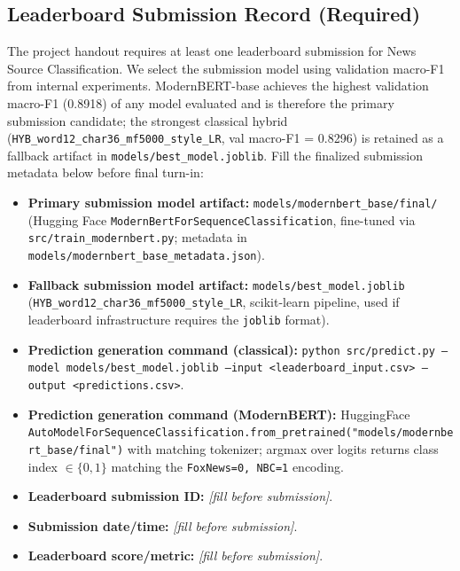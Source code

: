 \documentclass[10pt]{article}
\begin{document}
\subsection{Leaderboard Submission Record (Required)}
The project handout requires at least one leaderboard submission for News Source Classification. We select the submission model using validation macro-F1 from internal experiments. ModernBERT-base achieves the highest validation macro-F1 (0.8918) of any model evaluated and is therefore the primary submission candidate; the strongest classical hybrid (\texttt{HYB\_word12\_char36\_mf5000\_style\_LR}, val macro-F1 = 0.8296) is retained as a fallback artifact in \texttt{models/best\_model.joblib}. Fill the finalized submission metadata below before final turn-in:
\begin{itemize}
    \item \textbf{Primary submission model artifact:} \texttt{models/modernbert\_base/final/} (Hugging Face \texttt{ModernBertForSequenceClassification}, fine-tuned via \texttt{src/train\_modernbert.py}; metadata in \texttt{models/modernbert\_base\_metadata.json}).
    \item \textbf{Fallback submission model artifact:} \texttt{models/best\_model.joblib} (\texttt{HYB\_word12\_char36\_mf5000\_style\_LR}, scikit-learn pipeline, used if leaderboard infrastructure requires the \texttt{joblib} format).
    \item \textbf{Prediction generation command (classical):} \texttt{python src/predict.py --model models/best\_model.joblib --input <leaderboard\_input.csv> --output <predictions.csv>}.
    \item \textbf{Prediction generation command (ModernBERT):} HuggingFace \texttt{AutoModelForSequenceClassification.from\_pretrained("models/modernbert\_base/final")} with matching tokenizer; argmax over logits returns class index $\in\{0,1\}$ matching the \texttt{FoxNews=0, NBC=1} encoding.
    \item \textbf{Leaderboard submission ID:} \emph{[fill before submission]}.
    \item \textbf{Submission date/time:} \emph{[fill before submission]}.
    \item \textbf{Leaderboard score/metric:} \emph{[fill before submission]}.
\end{itemize}

\end{document}
